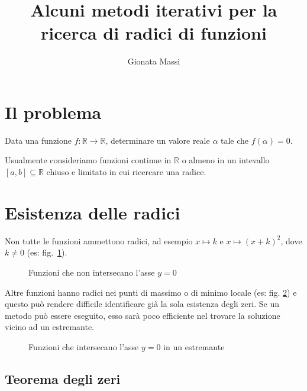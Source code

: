 \documentclass[12pt]{article}
\title{Alcuni metodi iterativi per la ricerca di radici di funzioni}
\author{Gionata Massi}
\date{} %
\theoremstyle{plain}%
\theoremstyle{definition}
\theoremstyle{remark}
\begin{document}
\maketitle

\thispagestyle{empty}%

\tableofcontents

\thispagestyle{empty}
\listoffigures
\listoftables
\newpage
{}

\section{Il problema}

Data una funzione $f : \mathbb{R} \to \mathbb{R}$, determinare un valore reale $\alpha$ tale che $f(\alpha) = 0$.

Usualmente consideriamo funzioni continue in $\mathbb{R}$ o almeno in un intevallo $[a, b] \subseteq \mathbb{R}$ chiuso e limitato in cui ricercare una radice.

\section{Esistenza delle radici}

Non tutte le funzioni ammettono radici, ad esempio $x \mapsto k$ e $x \mapsto (x + k)^2$, dove $k \neq 0$ (es: fig.~\ref{fig:no_zeri}).

\begin{figure}[!htbp]
    \centering
    
    \caption{Funzioni che non intersecano l'asse $y = 0$}
    \label{fig:no_zeri}
\end{figure}
    
Altre funzioni hanno radici nei punti di massimo o di minimo locale (es: fig. \ref{fig:zero_estremante})
e questo può rendere difficile identificare già la sola esistenza degli zeri. Se un metodo può essere eseguito,
esso sarà poco efficiente nel trovare la soluzione vicino ad un estremante.

\begin{figure}[!htbp]
    \centering
    
    \caption{Funzioni che intersecano l'asse $y = 0$ in un estremante}
    \label{fig:zero_estremante}
\end{figure}

\subsection{Teorema degli zeri}
\end{document}
